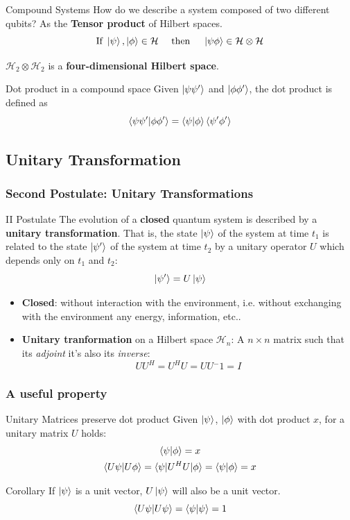 \documentclass{beamer}
\newcommand{\calH}{\mathcal{H}}
\newcommand{\kp}{\ket{\psi}}
\newcommand{\kf}{\ket{\phi}}
\newcommand{\kz}{\ket{0}}
\newcommand{\ko}{\ket{1}}
\begin{document}
\begin{frame}{Compound Systems}
How do we describe a system composed of two different qubits? As the \textbf{Tensor product} of Hilbert spaces.
\[
	\text{If }\kp, \kf \in \calH \quad\text{ then }\quad \ket{\psi\phi} \in \calH \otimes \calH
\]

$\calH_2 \otimes \calH_2$ is a \textbf{four-dimensional Hilbert space}.

\begin{block}{Dot product in a compound space}
Given $\ket{\psi\psi^\prime}$ and $\ket{\phi\phi^\prime}$, the dot product is defined as
\[
	\braket{\psi\psi^\prime|\phi\phi^\prime} = \braket{\psi|\phi}\braket{\psi^\prime\phi^\prime}
\]
\end{block}
\end{frame}

\subsection{Unitary Transformation}	
\begin{frame}%
	\frametitle{Second Postulate: Unitary Transformations}
	\begin{block}{II Postulate}
	The evolution of a \textbf{closed} quantum system is described by a \textbf{unitary transformation}. That is, the state $\kp$ of the system at time $t_1$ is related to the state $\ket{\psi^\prime}$ of the system at time $t_2$ by a unitary operator $U$ which depends only on $t_1$ and $t_2$:
	$$ \ket{\psi^\prime} = U\kp$$
	\end{block}
	\begin{itemize}
	\pause\item \textbf{Closed}: without interaction with the environment, i.e. without exchanging with the environment any energy, information, etc..
	\pause\item \textbf{Unitary tranformation} on a Hilbert space $\calH_n$: A $n\times n$ matrix such that its \textit{adjoint} it's also its \textit{inverse}:
	\[UU^H = U^HU = UU{^-1} = I
	\] 
	\end{itemize}
	\end{frame}
	
\begin{frame}%
\frametitle{A useful property}
\begin{block}{Unitary Matrices preserve dot product}
Given $\kp$, $\kf$ with dot product $x$, for a unitary matrix $U$ holds:\begin{gather*}
\braket{\psi|\phi} = x \\
\braket{U\psi | U\phi} =  \braket{\psi| U^H  U |\phi} = \braket{\psi|\phi} = x
\end{gather*}
\end{block}
\pause
\begin{block}{Corollary}
If $\kp$ is a unit vector, $U\kp$ will also be a unit vector.
$$\braket{U\psi | U\psi } = \braket{\psi |\psi} =  1$$
\end{block}
\end{frame}	
	
\end{document}
